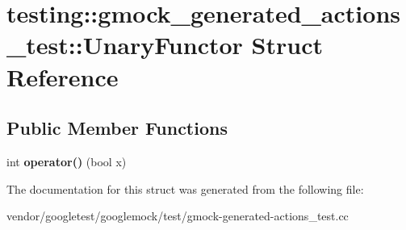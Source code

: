 \hypertarget{structtesting_1_1gmock__generated__actions__test_1_1_unary_functor}{}\section{testing\+:\+:gmock\+\_\+generated\+\_\+actions\+\_\+test\+:\+:Unary\+Functor Struct Reference}
\label{structtesting_1_1gmock__generated__actions__test_1_1_unary_functor}
\subsection*{Public Member Functions}
\begin{DoxyCompactItemize}
\item 
\mbox{\label{structtesting_1_1gmock__generated__actions__test_1_1_unary_functor_aeae4c0025faeac92845d652b35ac2846}} 
int {\bfseries operator()} (bool x)
\end{DoxyCompactItemize}


The documentation for this struct was generated from the following file\+:\begin{DoxyCompactItemize}
\item 
vendor/googletest/googlemock/test/gmock-\/generated-\/actions\+\_\+test.\+cc\end{DoxyCompactItemize}
